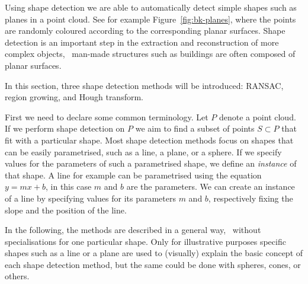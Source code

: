Using shape detection we are able to automatically detect simple shapes such as planes in a point cloud.
See for example Figure~\ref{fig:bk-planes}, where the points are randomly coloured according to the corresponding planar surfaces.
Shape detection is an important step in the extraction and reconstruction of more complex objects, \eg\ man-made structures such as buildings are often composed of planar surfaces.

In this section, three shape detection methods will be introduced: RANSAC, region growing, and Hough transform.


First we need to declare some common terminology.
Let $P$ denote a point cloud. 
If we perform shape detection on $P$ we aim to find a subset of points $S \subset P$ that fit with a particular shape. 
Most shape detection methods focus on shapes that can be easily parametrised, such as a line, a plane, or a sphere. 
If we specify values for the parameters of such a parametrised shape, we define an \emph{instance} of that shape.
A line for example can be parametrised using the equation $y = mx + b$, in this case $m$ and $b$ are the parameters.
We can create an instance of a line by specifying values for its parameters $m$ and $b$, respectively fixing the slope and the position of the line.

In the following, the methods are described in a general way, \ie\ without specialisations for one particular shape.
Only for illustrative purposes specific shapes such as a line or a plane are used to (visually) explain the basic concept of each shape detection method, but the same could be done with spheres, cones, or others.




